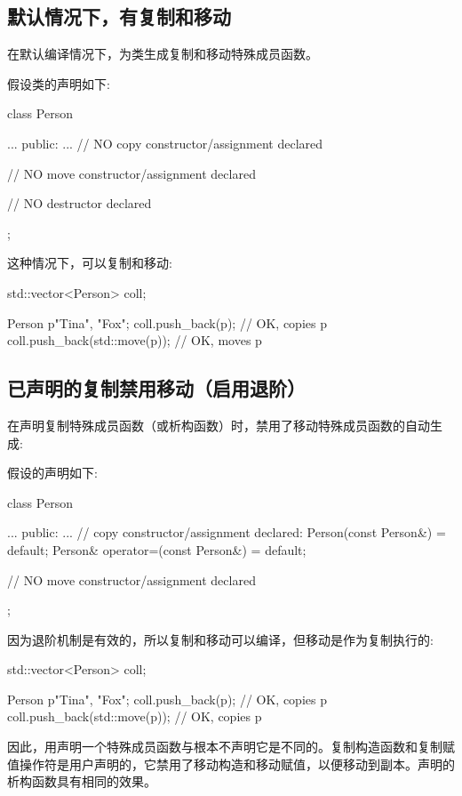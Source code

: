 \subsection{默认情况下，有复制和移动}

在默认编译情况下，为类生成复制和移动特殊成员函数。

假设类的声明如下:

\begin{cppcode}
class Person {
	...
public:
	...
	// NO copy constructor/assignment declared

	// NO move constructor/assignment declared

	// NO destructor declared
};
\end{cppcode}

这种情况下，可以复制和移动:

\begin{cppcode}
std::vector<Person> coll;

Person p{"Tina", "Fox"};
coll.push_back(p); // OK, copies p
coll.push_back(std::move(p)); // OK, moves p
\end{cppcode}

\subsection{已声明的复制禁用移动（启用退阶）}

在声明复制特殊成员函数（或析构函数）时，禁用了移动特殊成员函数的自动生成:

假设的声明如下:

\begin{cppcode}
class Person {
	...
public:
	...
	// copy constructor/assignment declared:
	Person(const Person&) = default;
	Person& operator=(const Person&) = default;

	// NO move constructor/assignment declared
};
\end{cppcode}

因为退阶机制是有效的，所以复制和移动可以编译，但移动是作为复制执行的:

\begin{cppcode}
std::vector<Person> coll;

Person p{"Tina", "Fox"};
coll.push_back(p); // OK, copies p
coll.push_back(std::move(p)); // OK, copies p
\end{cppcode}

因此，用声明一个特殊成员函数与根本不声明它是不同的。复制构造函数和复制赋值操作符是用户声明的，它禁用了移动构造和移动赋值，以便移动到副本。声明的析构函数具有相同的效果。

